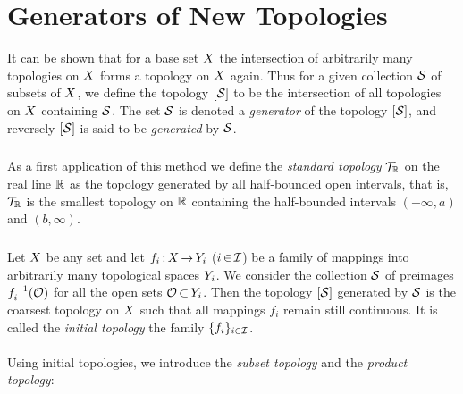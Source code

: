 \documentclass[11pt,twoside]{article}
\begin{document}
\section{Generators of New Topologies}                                         %
It can be shown
that for a base set $X$ the intersection of arbitrarily
many topologies on $X$ forms a topology on $X$ again.
Thus for a given collection $\mathcal{S}$ of subsets of $X$,
we define the topology $[\mathcal{S}]$ to be the intersection
of all topologies on $X$ containing $\mathcal{S}$.
The set $\mathcal{S}$ is denoted a \textit{generator} of the topology $[\mathcal{S}]$,
and reversely $[\mathcal{S}]$ is said to be \textit{generated} by $\mathcal{S}$.

\subparagraph{} %
As a first application of this method we define the \textit{standard topology}
$\mathcal{T}_{{\mathbb{R}}}$ on the real line ${\mathbb{R}}$ as the topology generated
by all half-bounded open intervals,
that is,
$\mathcal{T}_{{\mathbb{R}}}$ is the smallest topology on ${\mathbb{R}}$
containing the half-bounded intervals $(-\infty,a)$ and $(b,\infty)$.

\subparagraph{} %
Let $X$ be any set and
let $f_i {\,:\,} X {\,\to\,} Y_i$ ($i {\,\in\,} \mathcal{I}$) be a family of mappings
into arbitrarily many topological spaces $Y_i$.
We consider the collection $\mathcal{S}$ of preimages $f_i^{-1}(\mathcal{O})$
for all the open sets $\mathcal{O} {\,\subset\,} Y_i$.
Then the topology $[\mathcal{S}]$ generated by $\mathcal{S}$ is the coarsest
topology on $X$ such that all mappings $f_i$ remain still continuous.
It is called the \textit{initial topology} {\wrt} the family
$\{f_i\}_{i \in \mathcal{I}}$.

\paragraph{} %
Using initial topologies,
we introduce the \textit{subset topology} and the \textit{product topology}:
\end{document}
